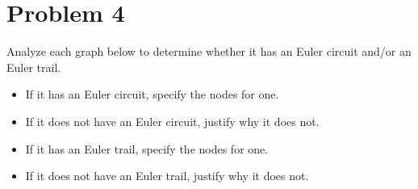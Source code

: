 \documentclass{amsart}
\theoremstyle{definition}
\theoremstyle{Exercise}
\theoremstyle{remark}
\theoremstyle{rule}
\numberwithin{equation}{section}
\begin{document}
	\section*{Problem 4}
	Analyze each graph below to determine whether it has an Euler circuit and/or
	an Euler trail.
	\begin{itemize}
		\item If it has an Euler circuit, specify the nodes for one.

		\item If it does not have an Euler circuit, justify why it does not.

		\item If it has an Euler trail, specify the nodes for one.

		\item If it does not have an Euler trail, justify why it does not.
	\end{itemize}
\end{document}
